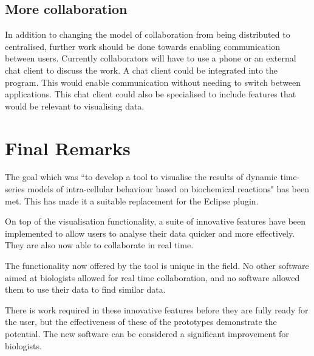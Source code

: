 \subsection{More collaboration}
In addition to changing the model of collaboration from being distributed to centralised, further work should be done towards enabling communication between users.  Currently collaborators will have to use a phone or an external chat client to discuss the work.  A chat client could be integrated into the program.  This would enable communication without needing to switch between applications.  This chat client could also be specialised to include features that would be relevant to visualising data.

\section{Final Remarks}

The goal which was ``to develop a tool to visualise the results of dynamic time-series models of intra-cellular behaviour based on biochemical reactions" has been met.  This has made it a suitable replacement for the Eclipse plugin.

On top of the visualisation functionality, a suite of innovative features have been implemented to allow users to analyse their data quicker and more effectively.  They are also now able to collaborate in real time.

The functionality now offered by the tool is unique in the field.  No other software aimed at biologists allowed for real time collaboration, and no software allowed them to use their data to find similar data.

There is work required in these innovative features before they are fully ready for the user, but the effectiveness of these of the prototypes demonstrate the potential.  The new software can be considered a significant improvement for biologists.
